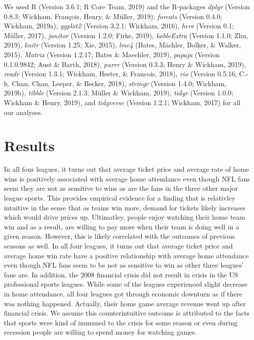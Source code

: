 \documentclass[man, fleqn, noextraspace,floatsintext]{apa6}
\begin{document}
We used R (Version 3.6.1; R Core Team, 2019) and the R-packages
\emph{dplyr} (Version 0.8.3; Wickham, François, Henry, \& Müller, 2019),
\emph{forcats} (Version 0.4.0; Wickham, 2019a), \emph{ggplot2} (Version
3.2.1; Wickham, 2016), \emph{here} (Version 0.1; Müller, 2017),
\emph{janitor} (Version 1.2.0; Firke, 2019), \emph{kableExtra} (Version
1.1.0; Zhu, 2019), \emph{knitr} (Version 1.25; Xie, 2015), \emph{lme4}
(Bates, Mächler, Bolker, \& Walker, 2015), \emph{Matrix} (Version
1.2.17; Bates \& Maechler, 2019), \emph{papaja} (Version 0.1.0.9842;
Aust \& Barth, 2018), \emph{purrr} (Version 0.3.3; Henry \& Wickham,
2019), \emph{readr} (Version 1.3.1; Wickham, Hester, \& Francois, 2018),
\emph{rio} (Version 0.5.16; C.-h. Chan, Chan, Leeper, \& Becker, 2018),
\emph{stringr} (Version 1.4.0; Wickham, 2019b), \emph{tibble} (Version
2.1.3; Müller \& Wickham, 2019), \emph{tidyr} (Version 1.0.0; Wickham \&
Henry, 2019), and \emph{tidyverse} (Version 1.2.1; Wickham, 2017) for
all our analyses.

\section{Results}\label{results}

In all four leagues, it turns out that average ticket price and average
rate of home wins is positively associated with average home attendance
even though NFL fans seem they are not as sensitive to wins as are the
fans in the three other major league sports. This provides empirical
evidence for a finding that is relativley intuitive in the sense that as
teams win more, demand for tickets likely increases which would drive
prices up. Ultimatley, people enjoy watching their home team win and as
a result, are willing to pay more when their team is doing well in a
given season. However, this is likely correlated with the outcomes of
previous seasons as well. In all four leagues, it turns out that average
ticket price and average home win rate have a positive relationship with
average home attendance even though NFL fans seem to be not as sensitive
to win as other three leagues' fans are. In addition, the 2008 financial
crisis did not result in crisis in the US professional sports leagues.
While some of the leagues experienced slight decrease in home
attendance, all four leagues got through economic downturn as if there
was nothing happened. Actually, their home game average revenue went up
after financial crisis. We assume this counterintuitive outcome is
attributed to the facts that sports were kind of immuned to the crisis
for some reason or even during recession people are willing to spend
money for watching games.
\end{document}
